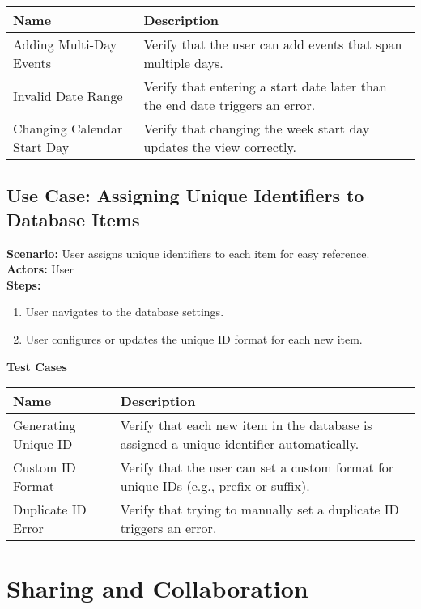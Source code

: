 \documentclass{article}
\begin{document}
            \begin{longtable}{|p{}|p{}|}
            \hline
            \textbf{Name} & \textbf{Description} \\
            \hline
            Adding Multi-Day Events & Verify that the user can add events that span multiple days. \\
\hline
Invalid Date Range & Verify that entering a start date later than the end date triggers an error. \\
\hline
Changing Calendar Start Day & Verify that changing the week start day updates the view correctly. \\
\hline
\end{longtable}\subsection{\textbf{Use Case: Assigning Unique Identifiers to Database Items}}
\textbf{Scenario:} User assigns unique identifiers to each item for easy reference.\\
\textbf{Actors:} User\\
\textbf{Steps:}
\begin{enumerate}
\item User navigates to the database settings.
\item User configures or updates the unique ID format for each new item.
\end{enumerate}
\textbf{Test Cases}

            \begin{longtable}{|p{}|p{}|}
            \hline
            \textbf{Name} & \textbf{Description} \\
            \hline
            Generating Unique ID & Verify that each new item in the database is assigned a unique identifier automatically. \\
\hline
Custom ID Format & Verify that the user can set a custom format for unique IDs (e.g., prefix or suffix). \\
\hline
Duplicate ID Error & Verify that trying to manually set a duplicate ID triggers an error. \\
\hline
\end{longtable}\section{\textbf{Sharing and Collaboration}}
\end{document}
